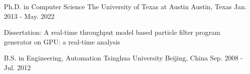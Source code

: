 

\begin{cventries}

  \cventry
  {Ph.D. in Computer Science} %
  {The University of Texas at Austin} %
  {Austin, Texas} %
  {Jan. 2013 - May. 2022} %
  {
    \begin{cvitems} %
    \item {Dissertation: A real-time throughput model based particle filter program generator on GPU: a real-time analysis}
    \end{cvitems}
  }
  \cventry
  {B.S. in Engineering, Automation}
  {Tsinghua University}
  {Beijing, China}
  {Sep. 2008 - Jul. 2012}
  {}
  
\end{cventries}
